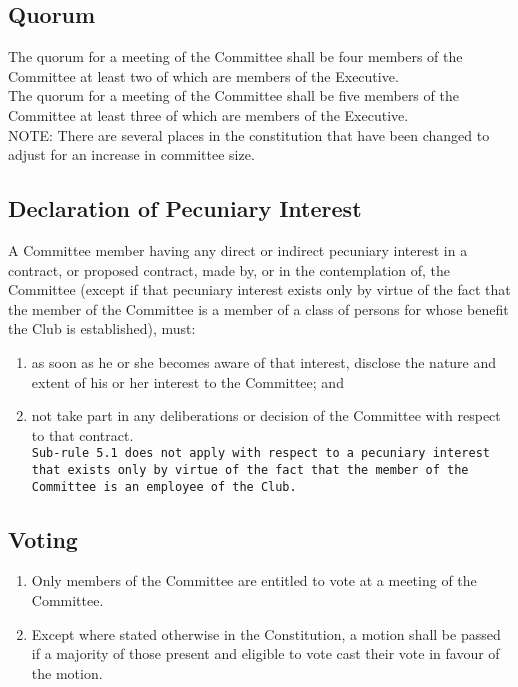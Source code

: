 \documentclass[11pt]{article} %
\begin{document}
\subsection{Quorum}
{\color{red} The quorum for a meeting of the Committee shall be four members of the Committee at least two of which are members of the Executive.}\\
{\color{ForestGreen} The quorum for a meeting of the Committee shall be five members of the Committee at least three of which are members of the Executive.}\\
{\color{Cyan}NOTE:
There are several places in the constitution that have been changed to adjust for an increase in committee size.
}

\subsection{Declaration of Pecuniary Interest}
A Committee member having any direct or indirect pecuniary interest in a contract, or proposed contract, made by, or in the contemplation of, the Committee (except if that pecuniary interest exists only by virtue of the fact that the member of the Committee is a member of a class of persons for whose benefit the Club is established), must:
\begin{enumerate}
	\item as soon as he or she becomes aware of that interest, disclose the nature and extent of his or her interest to the Committee; and
	\item not take part in any deliberations or decision of the Committee with respect to that contract.\\
\texttt{Sub-rule 5.1 does not apply with respect to a pecuniary interest that exists only by virtue of the fact that the member of the Committee is an employee of the Club.}
\end{enumerate}

\subsection{Voting}
\begin{enumerate}
	\item Only members of the Committee are entitled to vote at a meeting of the Committee.
	\item Except where stated otherwise in the Constitution, a motion shall be passed if a majority of those present and eligible to vote cast their vote in favour of the motion.
\end{enumerate}
\end{document}
